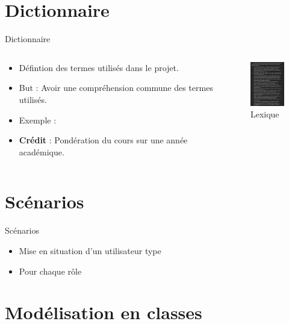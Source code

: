 \documentclass[numbering=fraction]{beamer}
\begin{document}
\section{Dictionnaire}
\begin{frame}{Dictionnaire}
    \begin{columns}
        \begin{column}{0.75\textwidth}
            \begin{itemize}
                \item Défintion des termes utilisés dans le projet.
                \item But : Avoir une compréhension commune des termes utilisés.
                \item Exemple :
                \item \textbf{Crédit} : Pondération du cours sur une année académique.
            \end{itemize}
        \end{column}
        \begin{column}{0.25\textwidth}
            \begin{figure}
                \centering
                \includegraphics[width=2cm]{1.png}
                \caption{Lexique}
            \end{figure}

        \end{column}
    \end{columns}
\end{frame}

\section{Scénarios}

\begin{frame}{Scénarios}
    \begin{itemize}
        \item Mise en situation d'un utilisateur type
        \item Pour chaque rôle
    \end{itemize}
\end{frame}

\section{Modélisation en classes}
\end{document}
